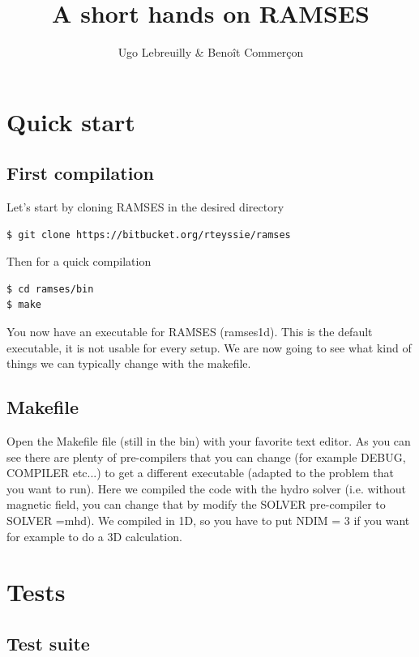 \documentclass{article}
\title{A short hands on RAMSES}
\author{Ugo Lebreuilly & Beno\^it Commer\c con}
\date{}
\begin{document}
\maketitle


\section{Quick start}
\subsection{First compilation}

Let's start by cloning RAMSES in the desired directory
\begin{lstlisting}[]
$ git clone https://bitbucket.org/rteyssie/ramses
\end{lstlisting}
Then for a quick compilation
\begin{lstlisting}[]
$ cd ramses/bin 
$ make
\end{lstlisting}
You now have an executable for RAMSES (ramses1d). This is the default executable, it is not usable for every setup. We are now going to see what kind of things we can typically change with the makefile. 
\subsection{Makefile}
Open the Makefile file (still in the bin) with your favorite text editor. As you can see there are plenty of pre-compilers that you can change (for example DEBUG, COMPILER etc...) to get a different executable (adapted to the problem that you want to run). Here we compiled the code with the hydro solver (i.e. without magnetic field, you can change that by modify the SOLVER pre-compiler to SOLVER =mhd). We compiled in 1D, so you have to put NDIM = 3 if you want for example to do a 3D calculation. 
\section{Tests}
\subsection{Test suite}
\end{document}
